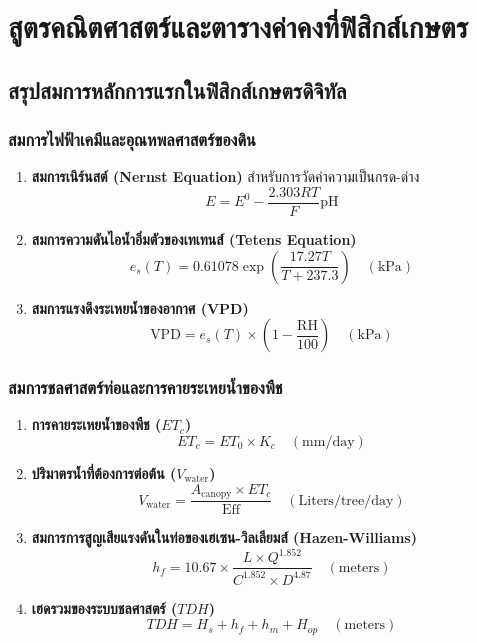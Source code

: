 \renewcommand{\thechapter}{ก}
\chapter{สูตรคณิตศาสตร์และตารางค่าคงที่ฟิสิกส์เกษตร}
\label{chap:appendixA}

\section{สรุปสมการหลักการแรกในฟิสิกส์เกษตรดิจิทัล}

\subsection{สมการไฟฟ้าเคมีและอุณหพลศาสตร์ของดิน}
\begin{enumerate}
    \item \textbf{สมการเนิร์นสต์ (Nernst Equation)} สำหรับการวัดค่าความเป็นกรด-ด่าง
    \begin{equation}
    E = E^0 - \frac{2.303 R T}{F} \text{pH}
    \end{equation}
    \item \textbf{สมการความดันไอน้ำอิ่มตัวของเทเทนส์ (Tetens Equation)}
    \begin{equation}
    e_s(T) = 0.61078 \exp\left( \frac{17.27 T}{T + 237.3} \right) \quad (\text{kPa})
    \end{equation}
    \item \textbf{สมการแรงดึงระเหยน้ำของอากาศ (VPD)}
    \begin{equation}
    \text{VPD} = e_s(T) \times \left( 1 - \frac{\text{RH}}{100} \right) \quad (\text{kPa})
    \end{equation}
\end{enumerate}

\subsection{สมการชลศาสตร์ท่อและการคายระเหยน้ำของพืช}
\begin{enumerate}
    \item \textbf{การคายระเหยน้ำของพืช ($ET_c$)}
    \begin{equation}
    ET_c = ET_0 \times K_c \quad (\text{mm/day})
    \end{equation}
    \item \textbf{ปริมาตรน้ำที่ต้องการต่อต้น ($V_{\text{water}}$)}
    \begin{equation}
    V_{\text{water}} = \frac{A_{\text{canopy}} \times ET_c}{\text{Eff}} \quad (\text{Liters/tree/day})
    \end{equation}
    \item \textbf{สมการการสูญเสียแรงดันในท่อของเฮเซน-วิลเลียมส์ (Hazen-Williams)}
    \begin{equation}
    h_f = 10.67 \times \frac{L \times Q^{1.852}}{C^{1.852} \times D^{4.87}} \quad (\text{meters})
    \end{equation}
    \item \textbf{เฮดรวมของระบบชลศาสตร์ ($TDH$)}
    \begin{equation}
    TDH = H_s + h_f + h_m + H_{op} \quad (\text{meters})
    \end{equation}
\end{enumerate}

